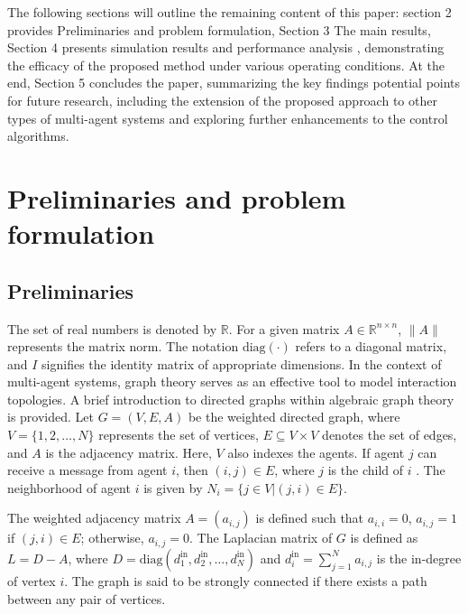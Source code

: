 \documentclass[journal,onecolumn]{IEEEtran}
\begin{document}
    The following sections will outline the remaining content of this paper:
    section 2 provides Preliminaries and problem formulation, Section 3 The main results, Section 4 presents simulation results and performance analysis , demonstrating the efficacy of the proposed method under various operating conditions.
    At the end, Section 5 concludes the paper, summarizing the key findings potential points for future research, including the extension of the proposed approach to other types of multi-agent systems and exploring further enhancements to the control algorithms.



\section{Preliminaries and problem formulation}\label{section:2}
\subsection{Preliminaries}



The set of real numbers is denoted by $\mathbb{R}$. For a given matrix $A \in \mathbb{R}^{n \times n}$, $\|A\|$ represents the matrix norm. The notation $\text{diag}(\cdot)$ refers to a diagonal matrix, and $I$ signifies the identity matrix of appropriate dimensions. In the context of multi-agent systems, graph theory serves as an effective tool to model interaction topologies. A brief introduction to directed graphs within algebraic graph theory is provided. Let $G = (V, E, A)$ be the weighted directed graph, where $V = \{1, 2, \dots, N\}$ represents the set of vertices, $E \subseteq V \times V$ denotes the set of edges, and $A$ is the adjacency matrix. Here, $V$ also indexes the agents. If agent $j$ can receive a message from agent $i$, then $(i, j) \in E$, where $j$ is the child of $i$ . The neighborhood of agent $i$ is given by $N_i = \{j \in V | (j, i) \in E \}$.

The weighted adjacency matrix $A = (a_{i,j})$ is defined such that $a_{i,i} = 0$, $a_{i,j} = 1$ if $(j, i) \in E$; otherwise, $a_{i,j} = 0$. The Laplacian matrix of $G$ is defined as $L = D - A$, where $D = \text{diag}(d_1^{\text{in}}, d_2^{\text{in}}, \dots, d_N^{\text{in}})$ and $d_i^{\text{in}} = \sum_{j=1}^{N} a_{i,j}$ is the in-degree of vertex $i$. The graph is said to be strongly connected if there exists a path between any pair of vertices.
\end{document}
